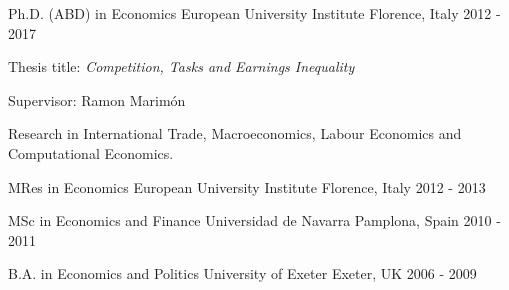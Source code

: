 

\begin{cventries}

  \cventry
    {Ph.D. (ABD) in Economics} %
    {European University Institute} %
    {Florence, Italy} %
    {2012 - 2017} %
    {
        \begin{cvitems} %
            \item {Thesis title: \textit{Competition, Tasks and Earnings Inequality}}
            \item {Supervisor: Ramon Marimón}
            \item {Research in International Trade, Macroeconomics, Labour Economics and Computational Economics.}
        \end{cvitems}
    }

\cventry
    {MRes in Economics} %
    {European University Institute} %
    {Florence, Italy} %
    {2012 - 2013} %
    {}

\cventry
    {MSc in Economics and Finance} %
    {Universidad de Navarra} %
    {Pamplona, Spain} %
    {2010 - 2011} %
    {}

\cventry
    {B.A. in Economics and Politics} %
    {University of Exeter} %
    {Exeter, UK} %
    {2006 - 2009} %
    {}

\end{cventries}

